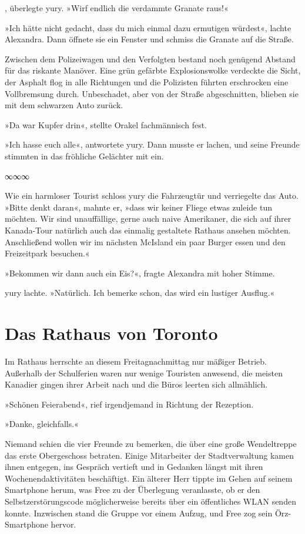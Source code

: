 , überlegte yury. »Wirf endlich die verdammte Granate raus!«

»Ich hätte nicht gedacht, dass du mich einmal dazu ermutigen würdest«, lachte Alexandra. Dann öffnete sie ein Fenster und schmiss die Granate auf die Straße.

Zwischen dem Polizeiwagen und den Verfolgten bestand noch genügend Abstand für das riskante Manöver. Eine grün gefärbte Explosionswolke verdeckte die Sicht, der Asphalt flog in alle Richtungen und die Polizisten führten erschrocken eine Vollbremsung durch. Unbeschadet, aber von der Straße abgeschnitten, blieben sie mit dem schwarzen Auto zurück.

»Da war Kupfer drin«, stellte Orakel fachmännisch fest.

»Ich hasse euch alle«, antwortete yury. Dann musste er lachen, und seine Freunde stimmten in das fröhliche Gelächter mit ein.

\begin{center}
	∞∞∞
\end{center}

Wie ein harmloser Tourist schloss yury die Fahrzeugtür und verriegelte das Auto. »Bitte denkt daran«, mahnte er, »dass wir keiner Fliege etwas zuleide tun möchten. Wir sind unauffällige, gerne auch naive Amerikaner, die sich auf ihrer Kanada-Tour natürlich auch das einmalig gestaltete Rathaus ansehen möchten. Anschließend wollen wir im nächsten McIsland ein paar Burger essen und den Freizeitpark besuchen.«

»Bekommen wir dann auch ein Eis?«, fragte Alexandra mit hoher Stimme.

yury lachte. »Natürlich. Ich bemerke schon, das wird ein lustiger Ausflug.«


\chapter{Das Rathaus von Toronto}

Im Rathaus herrschte an diesem Freitagnachmittag nur mäßiger Betrieb. Außerhalb der Schulferien waren nur wenige Touristen anwesend, die meisten Kanadier gingen ihrer Arbeit nach und die Büros leerten sich allmählich.

»Schönen Feierabend«, rief irgendjemand in Richtung der Rezeption.

»Danke, gleichfalls.«

Niemand schien die vier Freunde zu bemerken, die über eine große Wendeltreppe das erste Obergeschoss betraten. Einige Mitarbeiter der Stadtverwaltung kamen ihnen entgegen, ins Gespräch vertieft und in Gedanken längst mit ihren Wochenendaktivitäten beschäftigt. Ein älterer Herr tippte im Gehen auf seinem Smartphone herum, was Free zu der Überlegung veranlasste, ob er den Selbstzerstörungscode möglicherweise bereits über ein öffentliches WLAN senden konnte. Inzwischen stand die Gruppe vor einem Aufzug, und Free zog sein Örz-Smartphone hervor.

